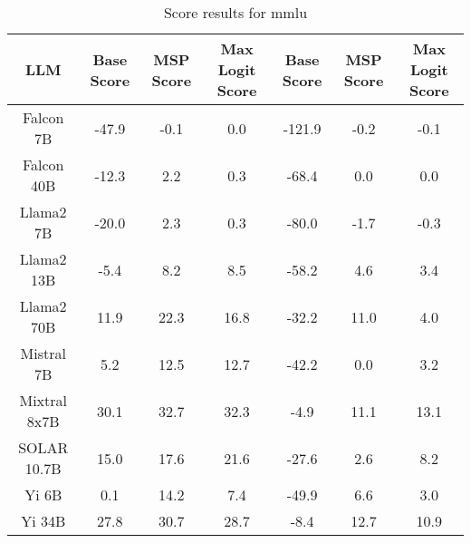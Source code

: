 \renewcommand\arraystretch{1.2}
\begin{table*}
\centering
\begin{tabular}{c|c|c|c|c|c|c}
LLM & Base Score & MSP Score & Max Logit Score & Base Score & MSP Score & Max Logit Score\\ \hline
Falcon 7B & -47.9 & -0.1 & 0.0 & -121.9 & -0.2 & -0.1\\
Falcon 40B & -12.3 & 2.2 & 0.3 & -68.4 & 0.0 & 0.0\\
Llama2 7B & -20.0 & 2.3 & 0.3 & -80.0 & -1.7 & -0.3\\
Llama2 13B & -5.4 & 8.2 & 8.5 & -58.2 & 4.6 & 3.4\\
Llama2 70B & 11.9 & 22.3 & 16.8 & -32.2 & 11.0 & 4.0\\
Mistral 7B & 5.2 & 12.5 & 12.7 & -42.2 & 0.0 & 3.2\\
Mixtral 8x7B & 30.1 & 32.7 & 32.3 & -4.9 & 11.1 & 13.1\\
SOLAR 10.7B & 15.0 & 17.6 & 21.6 & -27.6 & 2.6 & 8.2\\
Yi 6B & 0.1 & 14.2 & 7.4 & -49.9 & 6.6 & 3.0\\
Yi 34B & 27.8 & 30.7 & 28.7 & -8.4 & 12.7 & 10.9\\
\hline
\end{tabular}
\caption{Score results for mmlu}
\end{table*}
\label{tab:mmlu_score}
